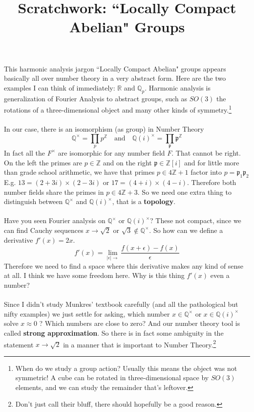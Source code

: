 \documentclass[12pt]{article}
\title{Scratchwork: ``Locally Compact Abelian" Groups}
\date{}
\begin{document}
\sffamily

\maketitle

\noindent This harmonic analysis jargon ``Locally Compact Abelian" groups appears basically all over number theory in a very abstract form.  Here are the two examples I can think of immediately: $\mathbb{R}$ and $\mathbb{Q}_p$.  Harmonic analysis is generalization of Fourier Analysis to abstract groups, such as $SO(3)$ the rotations of a three-dimensional object and many other kinds of symmetry.\footnote{When do we study a group action?  Usually this means the object was not  symmetric!  A cube can be rotated in three-dimensional space by $SO(3)$ elements, and we can study the remainder that's leftover.} \\ \\
In our case, there is an isomorphism (as group) in Number Theory
$$ \mathbb{Q}^\times = \prod_p p^{\mathbb{Z}} \quad\text{and}\quad
\mathbb{Q}(i)^\times = \prod_\mathfrak{p} \mathfrak{p}^{\mathbb{Z}} $$
In fact all the $F^\times$ are isomorphic for any number field $F$.  That cannot be right.  On the left the primes are $p \in \mathbb{Z}$ and on the right $\mathfrak{p} \in \mathbb{Z}[i]$ and for little more than grade school arithmetic, we have that primes $p \in 4\mathbb{Z}+1$ factor into $p = \mathfrak{p}_1\mathfrak{p}_2$ E.g. $13 = (2+3i)\times(2-3i)$ or $17 = (4+i)\times (4-i)$. Therefore both number fields share the primes in $p \in 4\mathbb{Z}+3$. So we need one extra thing to distinguish between $\mathbb{Q}^\times$ and $\mathbb{Q}(i)^\times$, that is a \textbf{topology}. \\ \\
Have you seen Fourier analysis on $\mathbb{Q}^\times$ or $\mathbb{Q}(i)^\times$?  These not compact, since we can find Cauchy sequences $x \to \sqrt{2}$ or $\sqrt{3} \notin \mathbb{Q}^\times$.  So how can we define a derivative $f'(x) = 2x$.
$$ f'(x) = \lim_{|\epsilon| \to } \frac{f(x + \epsilon) - f(x)}{\epsilon} $$
Therefore we need to find a space where this derivative makes any kind of sense at all.  I think we have some freedom here.  Why is this thing $f'(x)$ even a number? \\ \\
Since I didn't study Munkres' textbook carefully (and all the pathological but nifty examples) we just settle for asking, which number $x \in \mathbb{Q}^\times$ or $x \in \mathbb{Q}(i)^\times$ solve $x \approx 0$ ? Which numbers are close to zero?  And our number theory tool is called \textbf{strong approximation}.  So there is in fact some ambiguity in the statement $x \to \sqrt{2}$ in a manner that is important to Number Theory.\footnote{Don't just call their bluff, there should hopefully be a good reason.}
\vfill
\begin{thebibliography}{} 

\item 

\end{thebibliography}
\end{document}
